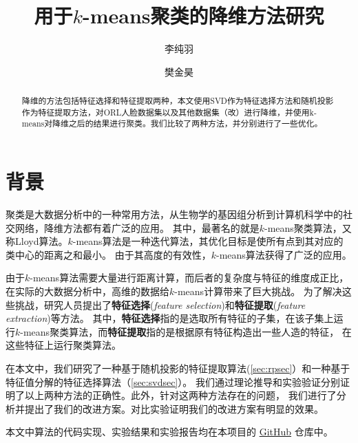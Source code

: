 \documentclass{ctexart}
\title{用于$k$-means聚类的降维方法研究}
\author{李纯羽 \and 樊金昊}
\begin{document}
    \maketitle

    \begin{abstract}
        降维的方法包括特征选择和特征提取两种，本文使用SVD作为特征选择方法和随机投影作为特征提取方法，对ORL人脸数据集以及其他数据集（改）进行降维，并使用k-means对降维之后的结果进行聚类。我们比较了两种方法，并分别进行了一些优化。
    \end{abstract}
    \tableofcontents
    \newpage

    \section{背景}
    聚类是大数据分析中的一种常用方法，从生物学的基因组分析到计算机科学中的社交网络，降维方法都有着广泛的应用\cite{Mahoney2009cur}。
    其中，最著名的就是$k$-means聚类算法，又称Lloyd算法。$k$-means算法是一种迭代算法，其优化目标是使所有点到其对应的类中心的距离之和最小\cite{blum2020foundations}。
    由于其高度的有效性，$k$-means算法获得了广泛的应用。

    由于$k$-means算法需要大量进行距离计算，而后者的复杂度与特征的维度成正比，在实际的大数据分析中，高维的数据给$k$-means计算带来了巨大挑战。
    为了解决这些挑战，研究人员提出了\textbf{特征选择}(\textit{feature selection})和\textbf{特征提取}(\textit{feature extraction})等方法。
    其中，\textbf{特征选择}指的是选取所有特征的子集，在该子集上运行$k$-means聚类算法，而\textbf{特征提取}指的是根据原有特征构造出一些人造的特征，
    在这些特征上运行聚类算法。

    在本文中，我们研究了一种基于随机投影的特征提取算法(\autoref{sec:rpsec}）和一种基于特征值分解的特征选择算法（\autoref{sec:svdsec}）。
    我们通过理论推导和实验验证分别证明了以上两种方法的正确性。此外，针对这两种方法存在的问题，
    我们进行了分析并提出了我们的改进方案。对比实验证明我们的改进方案有明显的效果。

    本文中算法的代码实现、实验结果和实验报告均在本项目的 \href{https://github.com/fandahao17/K-means-with-dimension-reduction}{GitHub} 仓库中。
    
\end{document}
